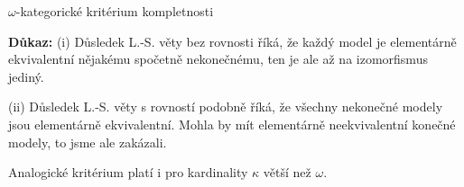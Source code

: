 \documentclass{beamer}
\begin{document}
\begin{frame}{$\omega$-kategorické kritérium kompletnosti}



    \textbf{Důkaz:}
    \alert{(i)} Důsledek L.-S. věty bez rovnosti říká, že každý model je elementárně ekvivalentní nějakému spočetně nekonečnému, ten je ale až na izomorfismus jediný.
    
    \alert{(ii)} Důsledek L.-S. věty s rovností podobně říká, že všechny nekonečné modely jsou elementárně ekvivalentní. Mohla by mít elementárně neekvivalentní konečné modely, to jsme ale zakázali. \hfill\qedsymbol

    \medskip


    Analogické kritérium platí i pro kardinality $\kappa$ větší než $\omega$.

\end{frame}
\end{document}
